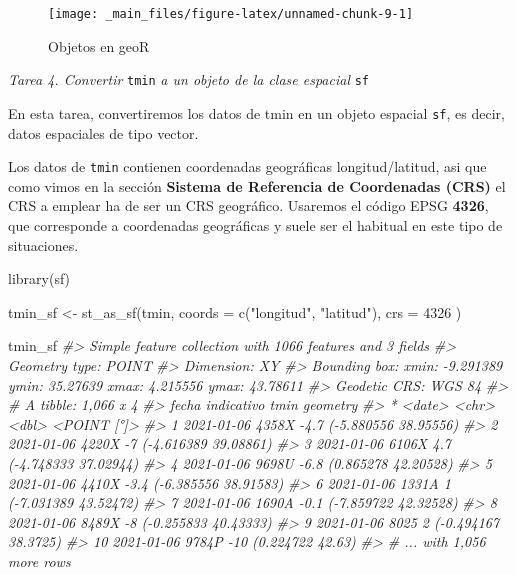 \documentclass[
]{book}
\newenvironment{Shaded}{\begin{snugshade}}{\end{snugshade}}
\newcommand{\AttributeTok}[1]{\textcolor[rgb]{0.77,0.63,0.00}{#1}}
\newcommand{\CommentTok}[1]{\textcolor[rgb]{0.56,0.35,0.01}{\textit{#1}}}
\newcommand{\DecValTok}[1]{\textcolor[rgb]{0.00,0.00,0.81}{#1}}
\newcommand{\FunctionTok}[1]{\textcolor[rgb]{0.00,0.00,0.00}{#1}}
\newcommand{\NormalTok}[1]{#1}
\newcommand{\OtherTok}[1]{\textcolor[rgb]{0.56,0.35,0.01}{#1}}
\newcommand{\StringTok}[1]{\textcolor[rgb]{0.31,0.60,0.02}{#1}}
\begin{document}
\begin{figure}

{\centering \texttt{[image: \_main\_files/figure-latex/unnamed-chunk-9-1]} 

}

\caption{Objetos en geoR}\label{fig:unnamed-chunk-9}
\end{figure}

\emph{Tarea 4. Convertir} \texttt{tmin} \emph{a un objeto de la clase espacial} \texttt{sf}

En esta tarea, convertiremos los datos de tmin en un objeto espacial \texttt{sf}, es
decir, datos espaciales de tipo vector.

Los datos de \texttt{tmin} contienen coordenadas geográficas longitud/latitud, asi que
como vimos en la sección \textbf{Sistema de Referencia de Coordenadas (CRS)} el CRS a
emplear ha de ser un CRS geográfico. Usaremos el código EPSG \textbf{4326}, que
corresponde a coordenadas geográficas y suele ser el habitual en este tipo de
situaciones.

\begin{Shaded}
\begin{Highlighting}[]
\FunctionTok{library}\NormalTok{(sf)}

\NormalTok{tmin\_sf }\OtherTok{\textless{}{-}} \FunctionTok{st\_as\_sf}\NormalTok{(tmin,}
  \AttributeTok{coords =} \FunctionTok{c}\NormalTok{(}\StringTok{"longitud"}\NormalTok{, }\StringTok{"latitud"}\NormalTok{),}
  \AttributeTok{crs =} \DecValTok{4326}
\NormalTok{)}

\NormalTok{tmin\_sf}
\CommentTok{\#\textgreater{} Simple feature collection with 1066 features and 3 fields}
\CommentTok{\#\textgreater{} Geometry type: POINT}
\CommentTok{\#\textgreater{} Dimension:     XY}
\CommentTok{\#\textgreater{} Bounding box:  xmin: {-}9.291389 ymin: 35.27639 xmax: 4.215556 ymax: 43.78611}
\CommentTok{\#\textgreater{} Geodetic CRS:  WGS 84}
\CommentTok{\#\textgreater{} \# A tibble: 1,066 x 4}
\CommentTok{\#\textgreater{}    fecha      indicativo  tmin             geometry}
\CommentTok{\#\textgreater{}  * \textless{}date\textgreater{}     \textless{}chr\textgreater{}      \textless{}dbl\textgreater{}          \textless{}POINT [°]\textgreater{}}
\CommentTok{\#\textgreater{}  1 2021{-}01{-}06 4358X       {-}4.7 ({-}5.880556 38.95556)}
\CommentTok{\#\textgreater{}  2 2021{-}01{-}06 4220X       {-}7   ({-}4.616389 39.08861)}
\CommentTok{\#\textgreater{}  3 2021{-}01{-}06 6106X        4.7 ({-}4.748333 37.02944)}
\CommentTok{\#\textgreater{}  4 2021{-}01{-}06 9698U       {-}6.8  (0.865278 42.20528)}
\CommentTok{\#\textgreater{}  5 2021{-}01{-}06 4410X       {-}3.4 ({-}6.385556 38.91583)}
\CommentTok{\#\textgreater{}  6 2021{-}01{-}06 1331A        1   ({-}7.031389 43.52472)}
\CommentTok{\#\textgreater{}  7 2021{-}01{-}06 1690A       {-}0.1 ({-}7.859722 42.32528)}
\CommentTok{\#\textgreater{}  8 2021{-}01{-}06 8489X       {-}8   ({-}0.255833 40.43333)}
\CommentTok{\#\textgreater{}  9 2021{-}01{-}06 8025         2    ({-}0.494167 38.3725)}
\CommentTok{\#\textgreater{} 10 2021{-}01{-}06 9784P      {-}10       (0.224722 42.63)}
\CommentTok{\#\textgreater{} \# ... with 1,056 more rows}
\end{Highlighting}
\end{Shaded}
\end{document}
